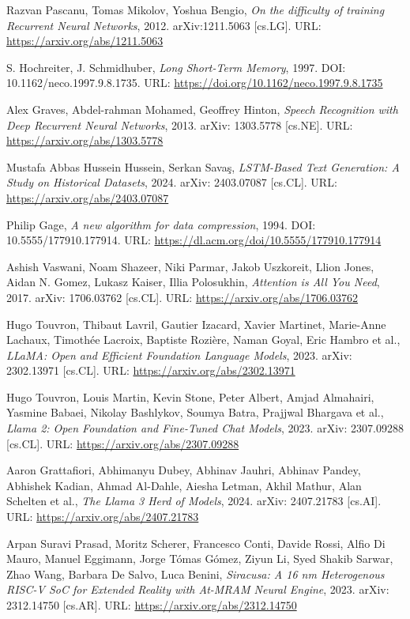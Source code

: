 \begin{thebibliography}{9}
	Razvan Pascanu, Tomas Mikolov, Yoshua Bengio,
	\textit{On the difficulty of training Recurrent Neural Networks},
	2012. arXiv:1211.5063 [cs.LG]. URL: \url{https://arxiv.org/abs/1211.5063}

	S. Hochreiter, J. Schmidhuber,
	\textit{Long Short-Term Memory}, 1997. DOI: 10.1162/neco.1997.9.8.1735.
	URL: \url{https://doi.org/10.1162/neco.1997.9.8.1735}

	Alex Graves, Abdel-rahman Mohamed, Geoffrey Hinton,
	\textit{Speech Recognition with Deep Recurrent Neural Networks},
	2013. arXiv: 1303.5778 [cs.NE]. URL: \url{https://arxiv.org/abs/1303.5778}

	Mustafa Abbas Hussein Hussein, Serkan Savaş,
	\textit{LSTM-Based Text Generation: A Study on Historical Datasets},
	2024. arXiv: 2403.07087 [cs.CL]. URL: \url{https://arxiv.org/abs/2403.07087}

	Philip Gage,
	\textit{A new algorithm for data compression}, 1994. DOI: 10.5555/177910.177914.
	URL: \url{https://dl.acm.org/doi/10.5555/177910.177914}

	Ashish Vaswani, Noam Shazeer, Niki Parmar, Jakob Uszkoreit, Llion Jones, Aidan N. Gomez, Lukasz Kaiser, Illia Polosukhin,
	\textit{Attention is All You Need},
	2017. arXiv: 1706.03762 [cs.CL]. URL: \url{https://arxiv.org/abs/1706.03762}

	Hugo Touvron, Thibaut Lavril, Gautier Izacard, Xavier Martinet, Marie-Anne Lachaux, Timothée Lacroix, Baptiste Rozière, Naman Goyal, Eric Hambro et al.,
	\textit{LLaMA: Open and Efficient Foundation Language Models},
	2023. arXiv: 2302.13971 [cs.CL]. URL: \url{https://arxiv.org/abs/2302.13971}

	Hugo Touvron, Louis Martin, Kevin Stone, Peter Albert, Amjad Almahairi, Yasmine Babaei, Nikolay Bashlykov, Soumya Batra, Prajjwal Bhargava et al.,
	\textit{Llama 2: Open Foundation and Fine-Tuned Chat Models},
	2023. arXiv: 2307.09288 [cs.CL]. URL: \url{https://arxiv.org/abs/2307.09288}

	Aaron Grattafiori, Abhimanyu Dubey, Abhinav Jauhri, Abhinav Pandey, Abhishek Kadian, Ahmad Al-Dahle, Aiesha Letman, Akhil Mathur, Alan Schelten et al.,
	\textit{The Llama 3 Herd of Models},
	2024. arXiv: 2407.21783 [cs.AI]. URL: \url{https://arxiv.org/abs/2407.21783}

	Arpan Suravi Prasad, Moritz Scherer, Francesco Conti, Davide Rossi, Alfio Di Mauro, Manuel Eggimann, Jorge Tómas Gómez, Ziyun Li, Syed Shakib Sarwar, Zhao Wang, Barbara De Salvo, Luca Benini,
	\textit{Siracusa: A 16 nm Heterogenous RISC-V SoC for Extended Reality with At-MRAM Neural Engine},
	2023. arXiv: 2312.14750 [cs.AR]. URL: \url{https://arxiv.org/abs/2312.14750}
	

\end{thebibliography}
